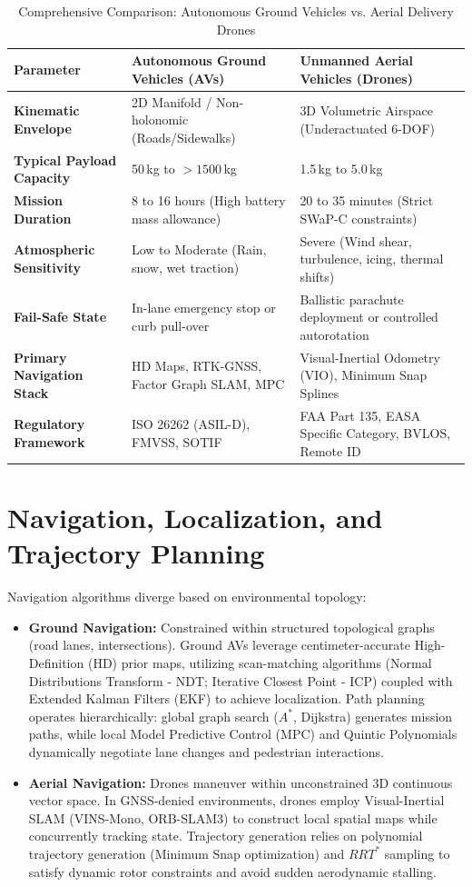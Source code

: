 \documentclass[conference,10pt]{IEEEtran}
\begin{document}
\begin{table}[t]
\centering
\caption{Comprehensive Comparison: Autonomous Ground Vehicles vs. Aerial Delivery Drones}
\label{tab:comparison}
\begin{tabular}{@{}lll@{}}
\toprule
\textbf{Parameter} & \textbf{Autonomous Ground Vehicles (AVs)} & \textbf{Unmanned Aerial Vehicles (Drones)} \\ \midrule
\textbf{Kinematic Envelope} & 2D Manifold / Non-holonomic (Roads/Sidewalks) & 3D Volumetric Airspace (Underactuated 6-DOF) \\
\textbf{Typical Payload Capacity} & 50\,kg to $>1500$\,kg & 1.5\,kg to 5.0\,kg \\
\textbf{Mission Duration} & 8 to 16 hours (High battery mass allowance) & 20 to 35 minutes (Strict SWaP-C constraints) \\
\textbf{Atmospheric Sensitivity} & Low to Moderate (Rain, snow, wet traction) & Severe (Wind shear, turbulence, icing, thermal shifts) \\
\textbf{Fail-Safe State} & In-lane emergency stop or curb pull-over & Ballistic parachute deployment or controlled autorotation \\
\textbf{Primary Navigation Stack} & HD Maps, RTK-GNSS, Factor Graph SLAM, MPC & Visual-Inertial Odometry (VIO), Minimum Snap Splines \\
\textbf{Regulatory Framework} & ISO 26262 (ASIL-D), FMVSS, SOTIF & FAA Part 135, EASA Specific Category, BVLOS, Remote ID \\ \bottomrule
\end{tabular}
\end{table}

\section{Navigation, Localization, and Trajectory Planning}
Navigation algorithms diverge based on environmental topology:
\begin{itemize}
    \item \textbf{Ground Navigation:} Constrained within structured topological graphs (road lanes, intersections). Ground AVs leverage centimeter-accurate High-Definition (HD) prior maps, utilizing scan-matching algorithms (Normal Distributions Transform - NDT; Iterative Closest Point - ICP) coupled with Extended Kalman Filters (EKF) to achieve localization. Path planning operates hierarchically: global graph search ($A^*$, Dijkstra) generates mission paths, while local Model Predictive Control (MPC) and Quintic Polynomials dynamically negotiate lane changes and pedestrian interactions.
    \item \textbf{Aerial Navigation:} Drones maneuver within unconstrained 3D continuous vector space. In GNSS-denied environments, drones employ Visual-Inertial SLAM (VINS-Mono, ORB-SLAM3) to construct local spatial maps while concurrently tracking state. Trajectory generation relies on polynomial trajectory generation (Minimum Snap optimization) and $RRT^*$ sampling to satisfy dynamic rotor constraints and avoid sudden aerodynamic stalling.
\end{itemize}
\end{document}
